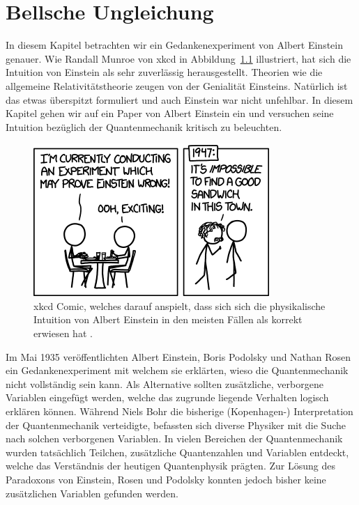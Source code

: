 \chapter{Bellsche Ungleichung\label{chapter:bell}}
\begin{refsection}

In diesem Kapitel betrachten wir ein Gedankenexperiment von Albert Einstein
genauer.
Wie Randall Munroe von xkcd in Abbildung~\ref{fig:bell:xkcd_einstein} illustriert,
hat sich die Intuition von Einstein als sehr zuverl\"assig herausgestellt.
Theorien wie die allgemeine Relativit\"atstheorie zeugen von der Genialit\"at
Einsteins.
Nat\"urlich ist das etwas \"uberspitzt formuliert und auch Einstein war nicht
unfehlbar.
In diesem Kapitel gehen wir auf ein Paper von Albert Einstein ein und versuchen
seine Intuition bez\"uglich der Quantenmechanik kritisch zu beleuchten.

\begin{figure}[b]
    \centering
    \includegraphics[width=0.5\linewidth]{bell/images/xkcd_einstein.png}
    \caption{xkcd Comic, welches darauf anspielt, dass sich sich die
    physikalische Intuition von Albert Einstein in den meisten F\"allen als
    korrekt erwiesen hat \cite{Bell:XkcdEinstein}.}
    \label{fig:bell:xkcd_einstein}
\end{figure}

Im Mai 1935 ver\"offentlichten Albert Einstein, Boris Podolsky und
Nathan Rosen ein Gedankenexperiment mit welchem sie erkl\"arten, wieso
die Quantenmechanik nicht vollst\"andig sein kann. Als Alternative
sollten zus\"atzliche, verborgene Variablen eingef\"ugt werden, welche
das zugrunde liegende Verhalten logisch erkl\"aren k\"onnen.
W\"ahrend Niels Bohr die bisherige (Kopenhagen-) Interpretation der 
Quantenmechanik verteidigte, befassten sich diverse Physiker mit die Suche
nach solchen verborgenen Variablen.
In vielen Bereichen der Quantenmechanik wurden tats\"achlich
Teilchen, zus\"atzliche Quantenzahlen und Variablen entdeckt, welche
das Verst\"andnis der heutigen Quantenphysik pr\"agten.
Zur L\"osung des Paradoxons von Einstein, Rosen und Podolsky konnten
jedoch bisher keine zus\"atzlichen Variablen gefunden werden.


\end{refsection}
